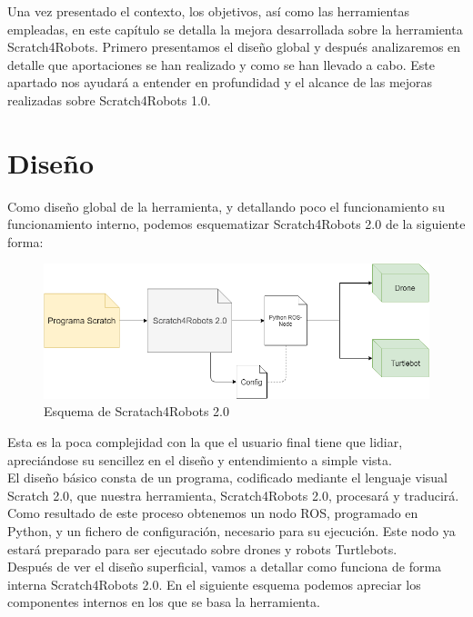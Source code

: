 Una vez presentado el contexto, los objetivos, así como las herramientas empleadas, en este capítulo se detalla la mejora desarrollada sobre la herramienta Scratch4Robots. Primero presentamos el diseño global y después analizaremos en detalle que aportaciones se han realizado y como se han llevado a cabo. Este apartado nos ayudará a entender en profundidad y el alcance de las mejoras realizadas sobre Scratch4Robots 1.0.\\

\clearpage
\section{Diseño}
\label{sec:diseno}
Como diseño global de la herramienta, y detallando poco el funcionamiento su funcionamiento interno, podemos esquematizar Scratch4Robots 2.0 de la siguiente forma:\\

\begin{figure}[H]
    \centering
    \includegraphics[scale=0.55]{img/esq-caja-negra.png}
  	\caption{Esquema de Scratach4Robots 2.0}
  	\label{fig:s4r-detalle}
\end{figure}

Esta es la poca complejidad con la que el usuario final tiene que lidiar, apreciándose su sencillez en el diseño y entendimiento a simple vista.\\

El diseño básico consta de un programa, codificado mediante el lenguaje visual Scratch 2.0, que nuestra herramienta, Scratch4Robots 2.0, procesará y traducirá. Como resultado de este proceso obtenemos un nodo ROS, programado en Python, y un fichero de configuración, necesario para su ejecución. Este nodo ya estará preparado para ser ejecutado sobre drones y robots Turtlebots.\\

Después de ver el diseño superficial, vamos a detallar como funciona de forma interna Scratch4Robots 2.0. En el siguiente esquema podemos apreciar los componentes internos en los que se basa la herramienta.\\


